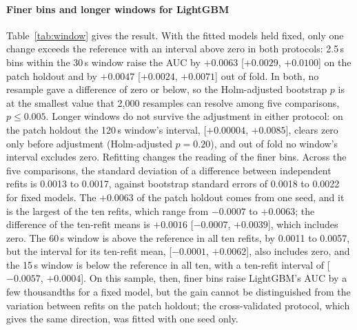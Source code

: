 \paragraph{Finer bins and longer windows for LightGBM}
Table~\ref{tab:window} gives the result. With the fitted models held fixed, only one change exceeds the
reference with an interval above zero in both protocols: 2.5\,s bins within the 30\,s window raise the
AUC by $+0.0063$ [$+0.0029$, $+0.0100$] on the patch holdout and by $+0.0047$ [$+0.0024$, $+0.0071$] out
of fold. In both, no resample gave a difference of zero or below, so the Holm-adjusted bootstrap $p$ is
at the smallest value that 2,000 resamples can resolve among five comparisons, $p \le 0.005$. Longer
windows do not survive the adjustment in either protocol: on the patch holdout the 120\,s window's
interval, [$+0.00004$, $+0.0085$], clears zero only before adjustment (Holm-adjusted $p = 0.20$), and out
of fold no window's interval excludes zero. Refitting changes the reading of the finer bins. Across the
five comparisons, the standard deviation of a difference between independent refits is 0.0013 to 0.0017,
against bootstrap standard errors of 0.0018 to 0.0022 for fixed models. The $+0.0063$ of the patch
holdout comes from one seed, and it is the largest of the ten refits, which range from $-0.0007$ to
$+0.0063$; the difference of the ten-refit means is $+0.0016$ [$-0.0007$, $+0.0039$], which includes
zero. The 60\,s window is above the reference in all ten refits, by 0.0011 to 0.0057, but the interval
for its ten-refit mean, [$-0.0001$, $+0.0062$], also includes zero, and the 15\,s window is below the
reference in all ten, with a ten-refit interval of [$-0.0057$, $+0.0004$]. On this sample, then, finer
bins raise LightGBM's AUC by a few thousandths for a fixed model, but the gain cannot be distinguished from
the variation between refits on the patch holdout; the cross-validated protocol, which gives the same
direction, was fitted with one seed only.

